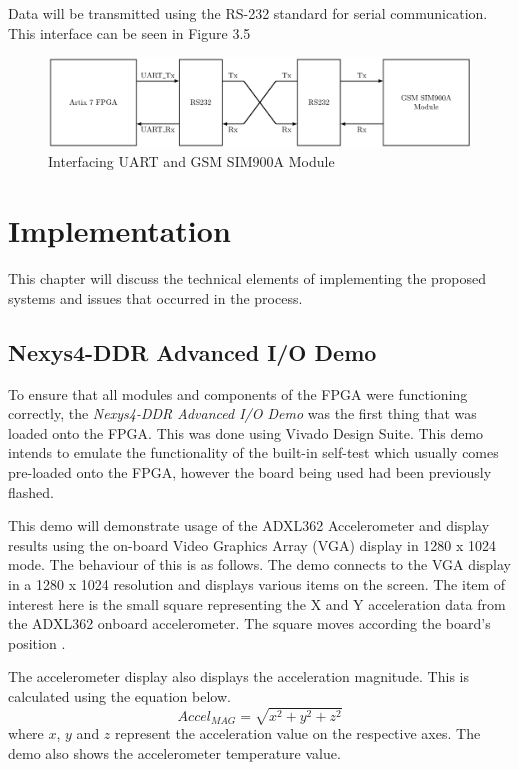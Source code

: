 \documentclass[12pt,a4paper]{report} %
\begin{document}
Data will be transmitted using the RS-232 standard for serial communication.
This interface can be seen in Figure 3.5
\begin{figure}[h]
\centerline{\includegraphics[width=1.0\textwidth]{diagrams/RS232}}
\caption{Interfacing UART and GSM SIM900A Module}
\end{figure}

\chapter{Implementation}
This chapter will discuss the technical elements of implementing the proposed systems and issues that occurred in the process.
\section{Nexys4-DDR Advanced I/O Demo}
To ensure that all modules and components of the FPGA were functioning correctly, the \textit{Nexys4-DDR Advanced I/O Demo} was the first thing that was loaded onto the FPGA.
This was done using Vivado Design Suite.
This demo intends to emulate the functionality of the built-in self-test which usually comes pre-loaded onto the FPGA, however the board being used had been previously flashed.

This demo will demonstrate usage of the ADXL362 Accelerometer and display results using the on-board Video Graphics Array (VGA) display in 1280 x 1024 mode.
The behaviour of this is as follows.
The demo connects to the VGA display in a 1280 x 1024 resolution and displays various items on the screen.
The item of interest here is the small square representing the X and Y acceleration data from the ADXL362 onboard accelerometer. The square moves according the board’s position \cite{demo}.

The accelerometer display also displays the acceleration magnitude.
This is calculated using the equation below.
\begin{equation} 
Accel_{MAG} = \sqrt{x^2 + y^2 + z^2}
\end{equation}
where $x$, $y$ and $z$ represent the acceleration value on the respective axes. The demo also shows the accelerometer temperature value.
\end{document}
